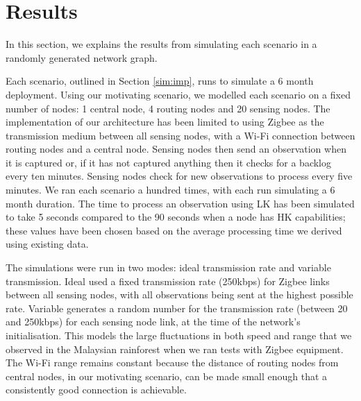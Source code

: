 \section{Results}
In this section, we explains the results from simulating each scenario in a randomly generated network graph. 

Each scenario, outlined in Section \ref{sim:imp}, runs to simulate a 6 month deployment. Using our motivating scenario, we modelled each scenario on a fixed number of nodes: 1 central node, 4 routing nodes and 20 sensing nodes. The implementation of our architecture has been limited to using Zigbee as the transmission medium between all sensing nodes, with a Wi-Fi connection between routing nodes and a central node. Sensing nodes then send an observation when it is captured or, if it has not captured anything then it checks for a backlog every ten minutes. Sensing nodes check for new observations to process every five minutes. We ran each scenario a hundred times, with each run simulating a 6 month duration. The time to process an observation using LK has been simulated to take 5 seconds compared to the 90 seconds when a node has HK capabilities; these values have been chosen based on the average processing time we derived using existing data. 

The simulations were run in two modes: ideal transmission rate and variable transmission. Ideal used a fixed transmission rate (250kbps) for Zigbee links between all sensing nodes, with all observations being sent at the highest possible rate. Variable generates a random number for the transmission rate (between 20 and 250kbps) for each sensing node link, at the time of the network's initialisation. This models the large fluctuations in both speed and range that we observed in the Malaysian rainforest when we ran tests with Zigbee equipment. The Wi-Fi range remains constant because the distance of routing nodes from central nodes, in our motivating scenario, can be made small enough that a consistently good connection is achievable.


